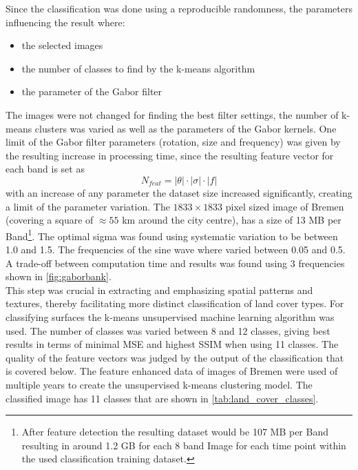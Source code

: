 \documentclass[12pt,a4paper, english,twoside]{scrartcl}
\begin{document}
      Since the classification was done using a reproducible randomness, the parameters influencing the result where:
      \begin{itemize}
        \item the selected images
        \item the number of classes to find by the k-means algorithm
        \item the parameter of the Gabor filter
      \end{itemize}
      The images were not changed for finding the best filter settings, the number of k-means clusters was varied as well as the parameters of the Gabor kernels. 
      One limit of the Gabor filter parameters (rotation, size and frequency) was given by the resulting increase in processing time, since the resulting feature vector for each band is set as      %
      \begin{equation}
        N_{feat} = |\theta| \cdot |\sigma| \cdot |f| 
      \end{equation}
      with an increase of any parameter the dataset size increased significantly, creating a limit of the parameter variation. 
    The $1833 \times 1833$ pixel sized image of Bremen (covering a square of $\approx 55$ km around the city centre), has a size of 13 MB per Band\footnote{%
    After feature detection the resulting dataset would be 107 MB per Band resulting in around 1.2 GB for each 8 band Image for each time point within the used classification training dataset.}.
    The optimal sigma was found using systematic variation to be between 1.0 and 1.5. 
    The frequencies of the sine wave where varied between 0.05 and 0.5. 
    A trade-off between computation time and results was found using 3 frequencies shown in \cref{fig:gaborbank}. \\ 
    This step was crucial in extracting and emphasizing spatial patterns and textures, thereby facilitating more distinct classification of land cover types.
      For classifying surfaces the k-means unsupervised machine learning algorithm was used.
      The number of classes was varied between 8 and 12 classes, giving best results in terms of minimal \gls{MSE} and highest \gls{SSIM} when using 11 classes.
      The quality of the feature vectors was judged by the output of the classification that is covered below. 
      The feature enhanced data of images of Bremen were used of multiple years to create the unsupervised k-means clustering model.
      The classified image has 11 classes that are shown in \cref{tab:land_cover_classes}.
\end{document}
